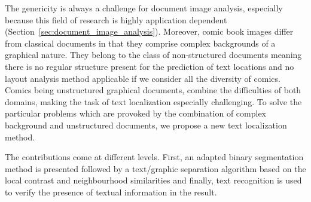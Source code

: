 The genericity is always a challenge for document image analysis, especially because this field of research is highly application dependent (Section~\ref{sec:document_image_analysis}).
Moreover, comic book images differ from classical documents in that they comprise complex backgrounds of a graphical nature.
They belong to the class of non-structured documents meaning there is no regular structure present for the prediction of text locations and no layout analysis method applicable if we consider all the diversity of comics.
Comics being unstructured graphical documents, combine the difficulties of both domains, making the task of text localization especially challenging.
To solve the particular problems which are provoked by the combination of complex background and unstructured documents, we propose a new text localization method.

The contributions come at different levels. 
First, an adapted binary segmentation method is presented followed by a text/graphic separation algorithm based on the local contrast and neighbourhood similarities and finally, text recognition is used to verify the presence of textual information in the result.



